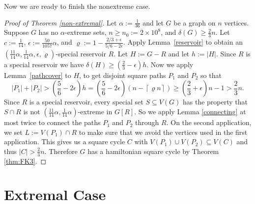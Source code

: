 \documentclass[oneside,12pt]{memoir}
\newcommand{\ep}{\epsilon}
\newcommand{\ceiling}[1]{\left\lceil#1\right\rceil}
\newcommand{\n}{2\times 10^8}
\begin{document}
Now we are ready to finish the nonextreme case.
\begin{proof}[Proof of Theorem \ref{non-extremal}]
Let $\alpha:=\frac{1}{36}$ and let $G$ be a graph on $n$ vertices. Suppose $G$ has no $\alpha$-extreme sets, $n\geq n_{0}:=\n$, and $\delta(G)\geq \frac{2}{3}n$.  Let $c:=\frac{1}{14}$, $\ep:=\frac{50}{1057}\alpha$, and $\varrho:=1-\frac{2/3+\ep}{5/6-2\ep}$.  Apply Lemma~\ref{reservoir} to obtain an $(\frac{11}{14}\alpha, \frac{1}{14}\alpha, \ep, \varrho)$-special reservoir $R$. Let $H:=G-R$ and let $h:=|H|$. Since $R$ is a special
reservoir we have $\delta(H)\geq(\frac{2}{3}-\ep)h$. Now we apply
Lemma~\ref{pathcover} to $H$, to get disjoint square paths $P_{1}$
and $P_{2}$ so that $$|P_{1}|+|P_{2}|>(\frac{5}{6}-2\ep)h=(\frac{5}{6}-2\ep)(n-\ceiling{\varrho n})\geq (\frac{2}{3}+\ep)n-1>\frac{2}{3}n.$$
Since $R$ is a special reservoir, every special set $S\subseteq V(G)$ has the property that $S\cap R$ is not $(\frac{11}{14}\alpha, \frac{1}{14}\alpha)$-extreme in $G[R]$. So we apply Lemma \ref{connecting} at most twice to connect the paths $P_{1}$ and $P_{2}$ through $R$.
On the second application, we set $L:=V(P_1)\cap R$ to make sure that we avoid the vertices used
in the first application. This gives us a square cycle $C$ with $V(P_{1})\cup V(P_{2})\subseteq V(C)$
and thus $|C|>\frac{2}{3}n$. Therefore $G$ has a hamiltonian square cycle by Theorem \ref{thm:FK3}.
\end{proof}

\section{Extremal Case\label{sec:Ex}}
\end{document}
